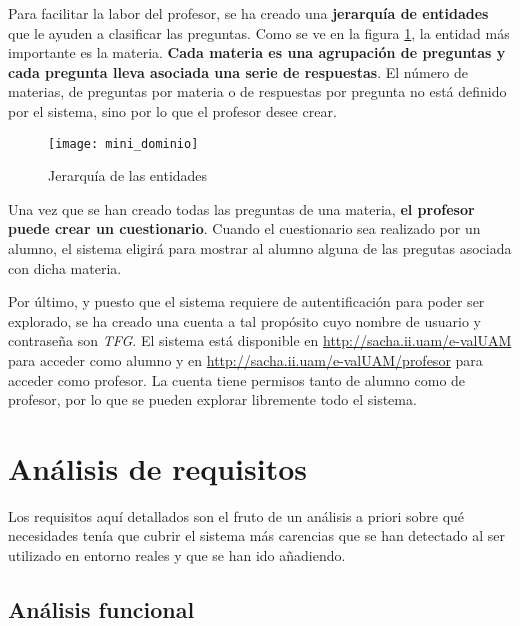 Para facilitar la labor del profesor, se ha creado una \textbf{jerarquía de entidades} que le ayuden a clasificar las preguntas. Como se ve en la figura \ref{fig:mini dominio}, la entidad más importante es la materia. \textbf{Cada materia es una agrupación de preguntas y cada pregunta lleva asociada una serie de respuestas}. El número de materias, de preguntas por materia o de respuestas por pregunta no está definido por el sistema, sino por lo que el profesor desee crear.

\begin{figure}[htp!]
	\centering
	\texttt{[image: mini\_dominio]}
	\caption{Jerarquía de las entidades}
	\label{fig:mini dominio}
\end{figure}

Una vez que se han creado todas las preguntas de una materia, \textbf{el profesor puede crear un cuestionario}. Cuando el cuestionario sea realizado por un alumno, el sistema eligirá para mostrar al alumno alguna de las pregutas asociada con dicha materia.

Por último, y puesto que el sistema requiere de autentificación para poder ser explorado, se ha creado una cuenta a tal propósito cuyo nombre de usuario y contraseña son \textit{TFG}. El sistema está disponible en \url{http://sacha.ii.uam/e-valUAM} para acceder como alumno y en \url{http://sacha.ii.uam/e-valUAM/profesor} para acceder como profesor. La cuenta tiene permisos tanto de alumno como de profesor, por lo que se pueden explorar libremente todo el sistema.




\section{Análisis de requisitos}

Los requisitos aquí detallados son el fruto de un análisis a priori sobre qué necesidades tenía que cubrir el sistema más carencias que se han detectado al ser utilizado en entorno reales y que se han ido añadiendo. %

\subsection{Análisis funcional}

